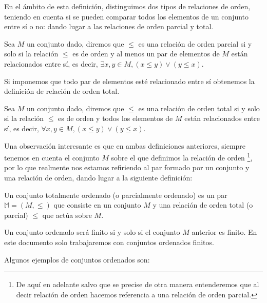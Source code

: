 \documentclass[oneside,openright,titlepage,numbers=noenddot,openany,headinclude,footinclude=true,
cleardoublepage=empty,abstractoff,BCOR=5mm,paper=a4,fontsize=12pt,main=spanish]{scrreprt}
\begin{document}
En el ámbito de esta definición, distinguimos dos tipos de relaciones de orden, teniendo en cuenta si se pueden comparar todos los elementos de un conjunto entre sí o no: dando lugar a las relaciones de orden parcial y total.


\begin{definition}
Sea $M$ un conjunto dado, diremos que $\leq $ es una relación de orden parcial si y solo si la relación $\leq$ es de orden y al menos un par de elementos de  $M$ están relacionados entre sí, es decir, 
$\exists x,y \in M , (x\leq y) \vee (y \leq x)$.
\end{definition}


Si imponemos que todo par de elementos esté relacionado entre sí obtenemos la definición de relación de orden total.

\begin{definition}
Sea $M$ un conjunto dado, diremos que $\leq $ es una relación de orden total si y solo si la relación $\leq$ es de orden y todos los elementos de $M$ están relacionados entre sí, es decir, 
$\forall x,y \in M , (x \leq y) \vee (y \leq x)$.
\end{definition}

Una observación interesante es que en ambas definiciones anteriores, siempre tenemos en cuenta el conjunto $M$ sobre el que definimos la relación de orden \footnote{De aquí en adelante salvo que se precise de otra manera entenderemos que al decir relación de orden hacemos referencia a una relación de orden parcial.}, por lo que realmente nos estamos refiriendo al par formado por un conjunto y una relación de orden, dando lugar a la siguiente definición:

\begin{definition} Un conjunto totalmente ordenado (o parcialmente ordenado) es un par $\mathbb{M} = (M, \leq)$ que consiste en un conjunto $M$ y una relación de orden total (o parcial) $\leq$ que actúa sobre $M$.
\end{definition}

Un conjunto ordenado será finito si y solo si el conjunto $M$ anterior es finito. En este documento solo trabajaremos con conjuntos ordenados finitos. 

Algunos ejemplos de conjuntos ordenados son: 
\end{document}
